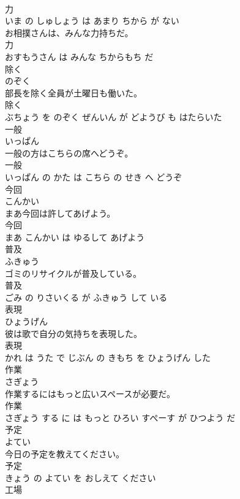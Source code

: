 \documentclass[8pt]{extreport}
\begin{document}
\begin{CJK}{UTF8}{min}
\\	力 
\\	いま の しゅしょう は あまり ちから が ない			
\\	お相撲さんは、みんな力持ちだ。	
\\	力 
\\	おすもうさん は みんな ちからもち だ			
\\	除く	
\\	のぞく			
\\	部長を除く全員が土曜日も働いた。	
\\	除く 
\\	ぶちょう を のぞく ぜんいん が どようび も はたらいた			
\\	一般	
\\	いっぱん			
\\	一般の方はこちらの席へどうぞ。	
\\	一般 
\\	いっぱん の かた は こちら の せき へ どうぞ			
\\	今回	
\\	こんかい			
\\	まあ今回は許してあげよう。	
\\	今回 
\\	まあ こんかい は ゆるして あげよう			
\\	普及	
\\	ふきゅう			
\\	ゴミのリサイクルが普及している。	
\\	普及 
\\	ごみ の りさいくる が ふきゅう して いる			
\\	表現	
\\	ひょうげん			
\\	彼は歌で自分の気持ちを表現した。	
\\	表現 
\\	かれ は うた で じぶん の きもち を ひょうげん した			
\\	作業	
\\	さぎょう			
\\	作業するにはもっと広いスペースが必要だ。	
\\	作業 
\\	さぎょう する に は もっと ひろい すぺーす が ひつよう だ			
\\	予定	
\\	よてい			
\\	今日の予定を教えてください。	
\\	予定 
\\	きょう の よてい を おしえて ください			
\\	工場	

\end{CJK}
\end{document}
